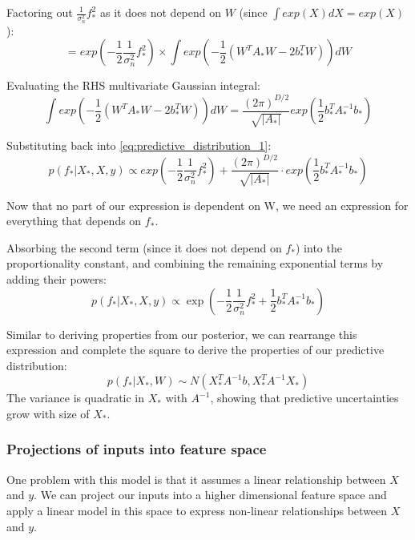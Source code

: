 Factoring out $\frac{1}{\sigma_n^2}f_*^2$ as it does not depend on $W$ (since $\int exp(X) dX = exp(X)$):
\begin{equation*}
    = exp\left(-\frac{1}{2}\frac{1}{\sigma_n^2}f_*^2\right) \times \int exp\left(-\frac{1}{2}\left(W^TA_*W - 2b_*^TW\right)\right) dW
\end{equation*}

Evaluating the RHS multivariate Gaussian integral:
\begin{equation*}
    \int exp\left(-\frac{1}{2} \left( W^TA_*W - 2b_*^TW \right) \right) dW = \frac{(2\pi)^{D/2}} {\sqrt{|A_*|}} exp\left( \frac{1}{2} b_*^TA_*^{-1}b_* \right)
\end{equation*}

Substituting back into \ref{eq:predictive_distribution_1}: 
\begin{equation*}
    p(f_*|X_*,X,y) \propto exp\left(-\frac{1}{2}\frac{1}{\sigma_n^2}f_*^2\right) + \frac{(2\pi)^{D/2}}{\sqrt{|A_*|}} \cdot exp\left(\frac{1}{2}b_*^TA_*^{-1}b_*\right)  
\end{equation*}
    
Now that no part of our expression is dependent on W, we need an expression for everything that depends on $f_*$. 

Absorbing the second term (since it does not depend on $f_*$) into the proportionality constant, and combining the remaining exponential terms by adding their powers:
\begin{equation*}
    p(f_*|X_*,X,y) \propto \exp\left(-\frac{1}{2}\frac{1}{\sigma_n^2}f_*^2 + \frac{1}{2}b_*^TA_*^{-1}b_*\right)
\end{equation*}

Similar to deriving properties from our posterior, we can rearrange this expression and complete the square to derive the properties of our predictive distribution:
\begin{equation} \label{eq:predictive_gaussian}
    p(f_*|X_*,W) \sim N(X_*^TA^{-1}b, X_*^TA^{-1}X_*)
\end{equation}
The variance is quadratic in $X_*$ with $A^{-1}$, showing that predictive uncertainties grow with size of $X_*$.

\subsubsection{Projections of inputs into feature space}
One problem with this model is that it assumes a linear relationship between $X$ and $y$. We can project our inputs into a higher dimensional feature space and apply a linear model in this space to express non-linear relationships between $X$ and $y$. 

